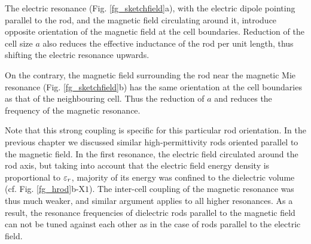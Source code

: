 The electric resonance (Fig. \ref{fg_sketchfield}a), with the electric dipole pointing parallel to the rod, and the magnetic field circulating around it, introduce opposite orientation of the magnetic field at the cell boundaries. Reduction of the cell size $a$ also reduces the effective inductance of the rod per unit length, thus shifting the electric resonance upwards.

On the contrary, the magnetic field surrounding the rod near the magnetic Mie resonance (Fig. \ref{fg_sketchfield}b) has the same orientation at the cell boundaries as that of the neighbouring cell. Thus the reduction of $a$ and reduces the frequency of the magnetic resonance.

Note that this strong coupling is specific for this particular rod orientation. In the previous chapter we discussed similar high-permittivity rods oriented parallel to the magnetic field. In the first resonance, the electric field circulated around the rod axis, but taking into account that the electric field energy density is proportional to $\varepsilon_r$, majority of its energy was confined to the dielectric volume (cf. Fig.  \ref{fg_hrod}b-$\text{X}1$).  The inter-cell coupling of the magnetic resonance was thus much weaker, and similar argument applies to all higher resonances. As a result, the resonance frequencies of dielectric rods parallel to the magnetic field can not be tuned against each other as in the case of rods parallel to the electric field.

